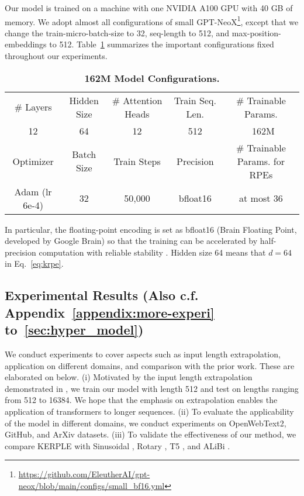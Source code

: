 Our model is trained on a machine with one NVIDIA A100 GPU with 40 GB of memory. We adopt almost all configurations of small GPT-NeoX\footnote{\url{https://github.com/EleutherAI/gpt-neox/blob/main/configs/small\_bf16.yml}}, except that we change the train-micro-batch-size to 32, seq-length to 512, and max-position-embeddings to 512. Table~\ref{tab:model_configs} summarizes the important configurations fixed throughout our experiments.
\begin{table}[!ht]
    \centering
    \setlength{\tabcolsep}{3pt}
    \caption{\textbf{162M Model Configurations.}}
    \begin{tabular}{ccccc}
        \hline\hline
         \# Layers & Hidden Size & \# Attention Heads & Train Seq. Len. & \# Trainable Params.\\
         12 & 64 & 12 & 512 & ~162M\\ \hline
         Optimizer & Batch Size & Train Steps & Precision & \# Trainable Params. for RPEs\\
         Adam (lr 6e-4) & 32 & 50,000 & bfloat16 & at most 36\\
         \hline\hline
    \end{tabular}
    \label{tab:model_configs}
\end{table}
In particular, the floating-point encoding is set as bfloat16 (Brain Floating Point, developed by Google Brain) so that the training can be accelerated by half-precision computation with reliable stability \citep{kalamkar2019bf16}. Hidden size 64 means that $d=64$ in Eq.~\eqref{eq:krpe}.

\subsection{Experimental Results (Also c.f. Appendix~\ref{appendix:more-experi} to~\ref{sec:hyper_model})}
\label{sec:experi_results}
We conduct experiments to cover aspects such as input length extrapolation, application on different domains, and comparison with the prior work. These are elaborated on below. (i) Motivated by the input length extrapolation demonstrated in \citep{press2022train}, we train our model with length 512 and test on lengths ranging from 512 to 16384. We hope that the emphasis on extrapolation enables the application of transformers to longer sequences. (ii) To evaluate the applicability of the model in different domains, we conduct experiments on OpenWebText2, GitHub, and ArXiv datasets. (iii) To validate the effectiveness of our method, we compare KERPLE with Sinusoidal \citep{vaswani2017attention}, Rotary \citep{su2021roformer}, T5 \citep{raffel2019exploring}, and ALiBi \citep{press2022train}.

